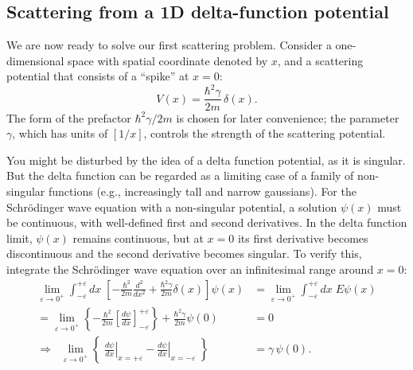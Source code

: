 \documentclass[pra,11pt]{revtex4}
\begin{document}
\subsection{Scattering from a 1D delta-function potential}

We are now ready to solve our first scattering problem.  Consider a
one-dimensional space with spatial coordinate denoted by $x$, and a
scattering potential that consists of a ``spike'' at $x = 0$:
$$V(x) = \frac{\hbar^2\gamma}{2m} \,\delta(x).$$
The form of the prefactor $\hbar^2\gamma/2m$ is chosen for later
convenience; the parameter $\gamma$, which has units of $[1/x]$,
controls the strength of the scattering potential.

You might be disturbed by the idea of a delta function potential, as
it is singular.  But the delta function can be regarded as a limiting
case of a family of non-singular functions (e.g., increasingly tall
and narrow gaussians).  For the Schr\"odinger wave equation with a
non-singular potential, a solution $\psi(x)$ must be continuous, with
well-defined first and second derivatives.  In the delta function
limit, $\psi(x)$ remains continuous, but at $x = 0$ its first
derivative becomes discontinuous and the second derivative becomes
singular.  To verify this, integrate the Schr\"odinger wave equation
over an infinitesimal range around $x = 0$:
$$\begin{aligned}\lim_{\varepsilon\rightarrow 0^+} \int_{-\varepsilon}^{+\varepsilon} dx\; \left[-\frac{\hbar^2}{2m} \frac{d^2}{dx^2} + \frac{\hbar^2\gamma}{2m} \delta(x)\right] \psi(x) &= \lim_{\varepsilon\rightarrow 0^+} \int_{-\varepsilon}^{+\varepsilon} dx\; E \psi(x) \\ = \lim_{\varepsilon\rightarrow 0^+} \left\{-\frac{\hbar^2}{2m} \left[\frac{d\psi}{dx}\right]_{-\varepsilon}^{+\varepsilon} \right\} + \frac{\hbar^2\gamma}{2m} \psi(0) &= 0\\ \Rightarrow \;\; \lim_{\varepsilon\rightarrow 0^+} \left\{\; \left.\frac{d\psi}{dx}\right|_{x = +\varepsilon} - \left.\frac{d\psi}{dx}\right|_{x = -\varepsilon}\; \right\}  &=  \gamma \,\psi(0).\end{aligned}$$
\end{document}
